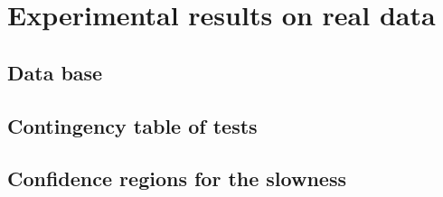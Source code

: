 \documentclass[graybox]{svmult/styles/svmult}
\begin{document}
 \section{Experimental results on real data}
\subsection{Data base}

\subsection{Contingency table of tests}

\subsection{Confidence regions for the slowness}
\end{document}
